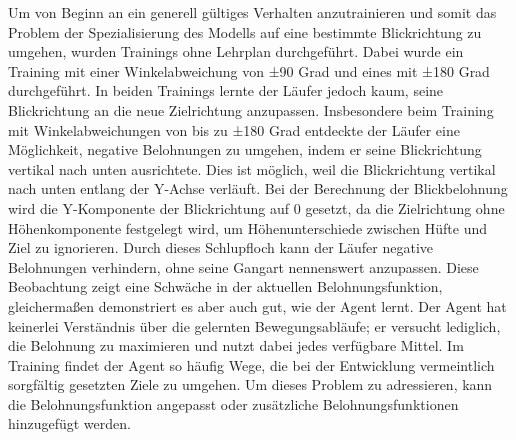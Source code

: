Um von Beginn an ein generell gültiges Verhalten anzutrainieren und somit das Problem der Spezialisierung des Modells auf eine bestimmte Blickrichtung zu umgehen, wurden Trainings ohne Lehrplan durchgeführt. Dabei wurde ein Training mit einer Winkelabweichung von ±90 Grad und eines mit ±180 Grad durchgeführt. In beiden Trainings lernte der Läufer jedoch kaum, seine Blickrichtung an die neue Zielrichtung anzupassen. Insbesondere beim Training mit Winkelabweichungen von bis zu ±180 Grad entdeckte der Läufer eine Möglichkeit, negative Belohnungen zu umgehen, indem er seine Blickrichtung vertikal nach unten ausrichtete. Dies ist möglich, weil die Blickrichtung vertikal nach unten entlang der Y-Achse verläuft. Bei der Berechnung der Blickbelohnung wird die Y-Komponente der Blickrichtung auf 0 gesetzt, da die Zielrichtung ohne Höhenkomponente festgelegt wird, um Höhenunterschiede zwischen Hüfte und Ziel zu ignorieren. Durch dieses Schlupfloch kann der Läufer negative Belohnungen verhindern, ohne seine Gangart nennenswert anzupassen. Diese Beobachtung zeigt eine Schwäche in der aktuellen Belohnungsfunktion, gleichermaßen demonstriert es aber auch gut, wie der Agent lernt. Der Agent hat keinerlei Verständnis über die gelernten Bewegungsabläufe; er versucht lediglich, die Belohnung zu maximieren und nutzt dabei jedes verfügbare Mittel. Im Training findet der Agent so häufig Wege, die bei der Entwicklung vermeintlich sorgfältig gesetzten Ziele zu umgehen. Um dieses Problem zu adressieren, kann die Belohnungsfunktion angepasst oder zusätzliche Belohnungsfunktionen hinzugefügt werden.

